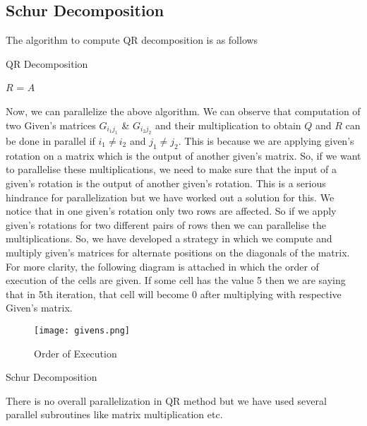 \documentclass[12pt,a4paper]{article}
\begin{document}
\subsection{Schur Decomposition}

The algorithm to compute QR decomposition is as follows

\begin{algorithm}
\caption{QR Decomposition}\label{euclid}
\begin{algorithmic}[1]
\State $R$ = $A$
\State {}
    \EndFor
\EndFor
{}
\end{algorithmic}
\end{algorithm}


Now, we can parallelize the above algorithm. We can observe that computation of two Given's matrices $G_{i_{1}j_{1}}$ & $G_{i_{2}j_{2}}$ and their multiplication to obtain $Q$ and $R$ can be done in parallel if $i_{1} \neq i_{2}$ and $j_{1} \neq j_{2}$. This is because we are applying given's rotation on a matrix which is the output of another given's matrix. So, if we want to parallelise these multiplications, we need to make sure that the input of a given's rotation is the output of another given's rotation. This is a serious hindrance for parallelization but we have worked out a solution for this. We notice that in one given's rotation only two rows are affected. So if we apply given's rotations for two different pairs of rows then we can parallelise the multiplications. So, we have developed a strategy in which we compute and multiply given's matrices for alternate positions on the diagonals of the matrix. For more clarity, the following diagram is attached in which the order of execution of the cells are given. If some cell has the value 5 then we are saying that in 5th iteration, that cell will become 0 after multiplying with respective Given's matrix.

\begin{figure}
    \centering
    \texttt{[image: givens.png]}
    \caption{Order of Execution}
\end{figure}

\begin{algorithm}
\caption{Schur Decomposition}\label{euclid}
\begin{algorithmic}[1]
\State {}
\EndFor
{}
\end{algorithmic}
\end{algorithm}
There is no overall parallelization in QR method but we have used several parallel subroutines like matrix multiplication etc.
\end{document}
